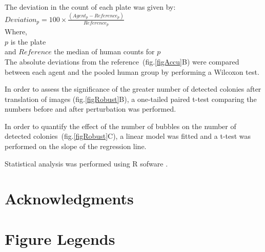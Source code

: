 \documentclass[10pt]{article}
\begin{document}
The deviation in the count of each plate was given by:\\
\newline{}
$Deviation_p =100\times{}\frac{ (Agent_p-Reference_p)}{Reference_p}$\\
\newline{}
Where,\\
$p$ is the plate\\
and $Reference$ the median of human counts for $p$\\

The absolute deviations from the reference~(fig.\ref{figAccu}B) were compared
between each agent and the pooled human group by performing a Wilcoxon test.

In order to assess the significance of the greater number of detected colonies
after translation of images (fig.\ref{figRobust}B), a  one-tailed paired t-test
comparing the numbers before and after perturbation was performed.

In order to quantify the effect of the number of bubbles on the number of
detected colonies~(fig.\ref{figRobust}C), a linear model was fitted and a t-test
was performed on the slope of the regression line.

Statistical analysis was performed using R sofware\cite{R} .
 
\section*{Acknowledgments}



\newpage{}

\section*{Figure Legends} 
\end{document}
